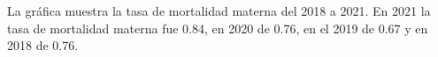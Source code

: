 La gráfica muestra la tasa de mortalidad materna del 2018 a 2021. En 2021 la tasa de mortalidad materna fue 0.84, en 2020 de 0.76, en el 2019 de 0.67 y en 2018 de 0.76. 